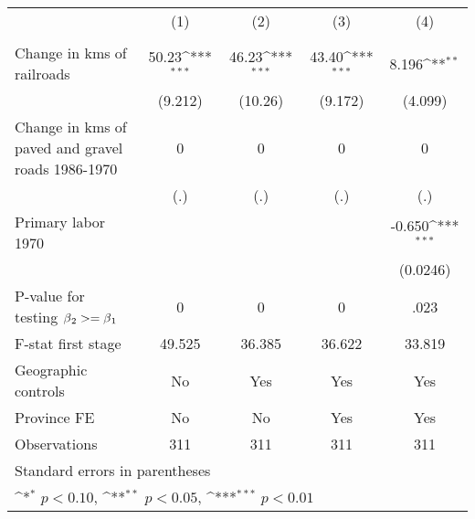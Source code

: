 {
\def\sym#1{\ifmmode^{#1}\else\(^{#1}\)\fi}
\begin{tabular}{l*{4}{c}}
\hline\hline
                &\multicolumn{1}{c}{(1)}&\multicolumn{1}{c}{(2)}&\multicolumn{1}{c}{(3)}&\multicolumn{1}{c}{(4)}\\
                &\multicolumn{1}{c}{}&\multicolumn{1}{c}{}&\multicolumn{1}{c}{}&\multicolumn{1}{c}{}\\
\hline
Change in kms of railroads&    50.23\sym{***}&    46.23\sym{***}&    43.40\sym{***}&    8.196\sym{**} \\
                &  (9.212)         &  (10.26)         &  (9.172)         &  (4.099)         \\
[1em]
Change in kms of paved and gravel roads 1986-1970&        0         &        0         &        0         &        0         \\
                &      (.)         &      (.)         &      (.)         &      (.)         \\
[1em]
Primary labor 1970&                  &                  &                  &   -0.650\sym{***}\\
                &                  &                  &                  & (0.0246)         \\
\hline
P-value for testing $\beta\\_2 >= \beta\\_1$&        0         &        0         &        0         &     .023         \\
F-stat first stage&   49.525         &   36.385         &   36.622         &   33.819         \\
Geographic controls&       No         &      Yes         &      Yes         &      Yes         \\
Province FE     &       No         &       No         &      Yes         &      Yes         \\
Observations    &      311         &      311         &      311         &      311         \\
\hline\hline
\multicolumn{5}{l}{\footnotesize Standard errors in parentheses}\\
\multicolumn{5}{l}{\footnotesize \sym{*} \(p<0.10\), \sym{**} \(p<0.05\), \sym{***} \(p<0.01\)}\\
\end{tabular}
}
